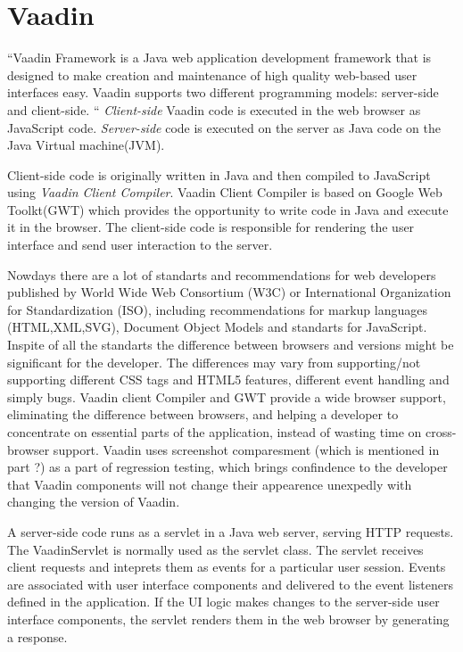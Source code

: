 	\chapter {Vaadin}
	\label{ch:vaadin}	
	
	 ``Vaadin Framework is a Java web application development framework that is
	designed to make creation and maintenance of high quality web-based user interfaces easy.
	 Vaadin supports two different programming models: server-side and client-side. 
	 `` \cite[pr1.1]{bookVaaidn}
	 \emph{Client-side} Vaadin code is executed in the web browser as JavaScript
	 code.
	 \emph{Server-side} code is executed on the server as Java code on the Java
	 Virtual machine(JVM).
	 
	 Client-side code is originally written in Java and then
	 compiled to JavaScript using \emph{Vaadin Client Compiler}. Vaadin Client Compiler is based on Google
	 Web Toolkt(GWT) which provides the opportunity to write code in Java and
	 execute it in the browser. The client-side code is responsible for rendering
	 the user interface and send user interaction to the server.
	
	 Nowdays there are a lot of standarts and recommendations for web
	 developers published by World Wide Web Consortium (W3C) or  International
	 Organization for Standardization (ISO), including recommendations for
	 markup languages (HTML,XML,SVG), Document Object Models and standarts
	 for JavaScript. Inspite of all the standarts the difference between browsers
	 and versions might be significant for the developer. The differences may vary
	 from supporting/not supporting different CSS tags and HTML5 features,
	 different event handling and simply bugs. Vaadin client Compiler and GWT provide a wide browser
	 support, eliminating the difference between browsers, and helping a
	 developer to concentrate on essential parts of the application, instead of
	 wasting time on cross-browser support. Vaadin uses screenshot comparesment
	 (which is mentioned in part ?) as a part of regression testing, which brings
	 confindence to the developer that Vaadin components will not change their
	 appearence unexpedly with changing the version of Vaadin. 
	 
	 A server-side code runs as a servlet in a Java web server, serving HTTP
	 requests.
	 The VaadinServlet is normally used as the servlet class. The servlet receives client requests
	 and inteprets them as events for a particular user session.
	 Events are associated with user interface components and delivered to the event listeners defined in the application.
	 If the UI logic makes changes to the server-side user interface components, 
	 the servlet renders them in the web browser by generating a response.
	 
